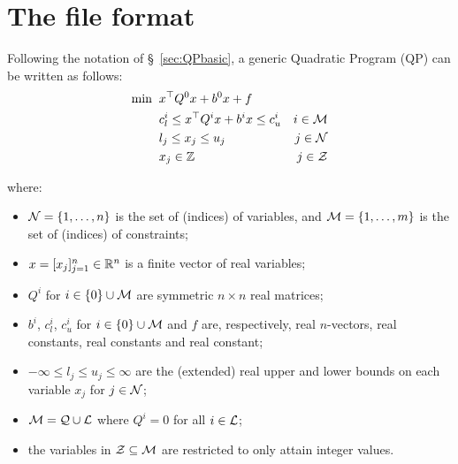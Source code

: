 \section{The file format}\label{sec:format}

\newcommand{\vect}[1]{\left(\begin{array}{c}#1\end{array}\right)}
\newcommand{\mat}[2]{\left(\begin{array}{#1}#2\end{array}\right)}
\newcommand{\arr}[2]{\begin{array}{#1}#2\end{array}}
\newcommand{\mininx}[1]{ {\renewcommand{\arraystretch}{0.8}
                     \begin{array}[t]{c}
                     \mbox{minimize} \vspace*{-1mm} \\
                     \mbox{ $\scriptstyle x \in \smallRe^n #1 $ }
                     \end{array} \;} }
\newcommand{\s}[1]{^{\mbox{\protect\tiny #1}}}
\newcommand{\sfrac}[2]{{\scriptstyle \frac{#1}{#2}}}
\newcommand{\half}{\sfrac{1}{2}}
\newcommand{\smallRe}
     {\mbox{\raisebox{-0.8pt}{\footnotesize I\hskip -1.5pt R\hskip -0.5pt}}}
\newcommand{\tim}[1]{\;\; \mbox{#1} \;\;}
\newcommand{\st}{\mbox{subject to}\;\;}
\newcommand{\lbox}[1]{\parbox[t]{105mm}{#1}\vspace*{1mm}}

Following the notation of \S~\ref{sec:QPbasic}, a generic Quadratic Program (QP) can be written as follows:
%
\begin{align*}
 \min \;\;
 & x^\top Q^0 x + b^0 x + f \\
 & c^i_l \leq x^\top Q^i x + b^i x \leq c^i_u & i \in \mathcal{M} \\
 & l_j \leq x_j \leq u_j & j \in \mathcal{N}  \\
 & x_j \in \mathbb{Z} & j \in \mathcal{Z}
\end{align*}

where:

\begin{itemize}
 \item $\mathcal{N} = \{ 1, \ldots, n \}$ is the set of (indices) of variables, and $\mathcal{M} = \{ 1, \ldots, m \}$ is the set of (indices) of constraints;
 \item $x = [x_j]_{j = 1}^n \in \mathbb{R}^n$ is a finite vector of real variables;
 \item $Q^i$ for $i \in \{ 0 \} \cup \mathcal{M}$ are symmetric $n \times n$ real matrices;
 \item $b^i$, $c^i_l$, $c^i_u$ for $i \in \{ 0 \} \cup \mathcal{M}$ and $f$ are, respectively, real $n$-vectors, real constants, real constants and real constant;
 \item $-\infty \leq l_j \leq u_j \leq \infty$ are the (extended) real upper and lower bounds on each variable $x_j$ for $j \in \mathcal{N}$;
 \item $\mathcal{M} = \mathcal{Q} \cup \mathcal{L}$ where $Q^i = 0$ for all $i \in \mathcal{L}$;
 \item the variables in $\mathcal{Z} \subseteq \mathcal{M}$ are restricted to only attain integer values.
\end{itemize}

